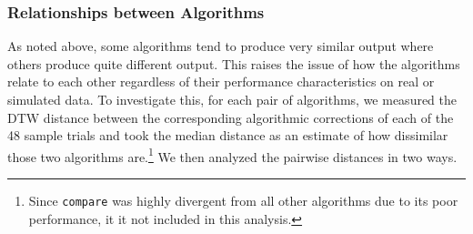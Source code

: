 \documentclass[doc,biblatex]{apa7}
\begin{document}
\subsubsection{Relationships between Algorithms}

As noted above, some algorithms tend to produce very similar output where others produce quite different output. This raises the issue of how the algorithms relate to each other regardless of their performance characteristics on real or simulated data. To investigate this, for each pair of algorithms, we measured the DTW distance between the corresponding algorithmic corrections of each of the 48 sample trials and took the median distance as an estimate of how dissimilar those two algorithms are.\footnote{Since \texttt{compare} was highly divergent from all other algorithms due to its poor performance, it it not included in this analysis.} We then analyzed the pairwise distances in two ways.
\end{document}
